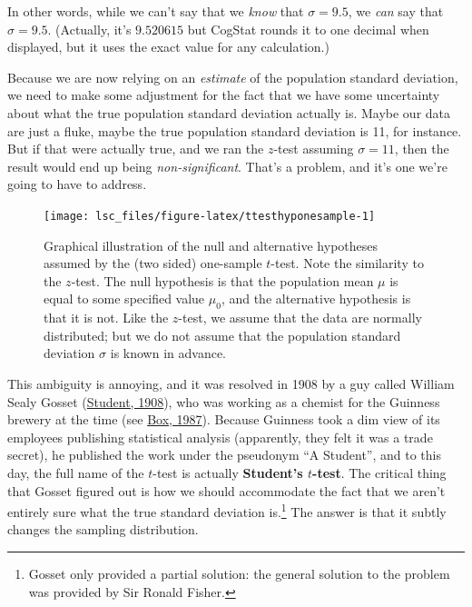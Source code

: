 \documentclass[
]{book}
\theoremstyle{definition}
\theoremstyle{definition}
\theoremstyle{definition}
\theoremstyle{definition}
\theoremstyle{remark}
\begin{document}
In other words, while we can't say that we \emph{know} that \(\sigma = 9.5\), we \emph{can} say that \(\hat\sigma = 9.5\). (Actually, it's \(9.520615\) but CogStat rounds it to one decimal when displayed, but it uses the exact value for any calculation.)

Because we are now relying on an \emph{estimate} of the population standard deviation, we need to make some adjustment for the fact that we have some uncertainty about what the true population standard deviation actually is. Maybe our data are just a fluke, maybe the true population standard deviation is 11, for instance. But if that were actually true, and we ran the \(z\)-test assuming \(\sigma=11\), then the result would end up being \emph{non-significant}. That's a problem, and it's one we're going to have to address.

\begin{figure}

{\centering \texttt{[image: lsc\_files/figure-latex/ttesthyponesample-1]} 

}

\caption{Graphical illustration of the null and alternative hypotheses assumed by the (two sided) one-sample $t$-test. Note the similarity to the $z$-test. The null hypothesis is that the population mean $\mu$ is equal to some specified value $\mu_0$, and the alternative hypothesis is that it is not. Like the $z$-test, we assume that the data are normally distributed; but we do not assume that the population standard deviation $\sigma$ is known in advance.}\label{fig:ttesthyponesample}
\end{figure}

This ambiguity is annoying, and it was resolved in 1908 by a guy called William Sealy Gosset (\protect\hyperlink{ref-Student1908}{Student, 1908}), who was working as a chemist for the Guinness brewery at the time (see \protect\hyperlink{ref-Box1987}{Box, 1987}). Because Guinness took a dim view of its employees publishing statistical analysis (apparently, they felt it was a trade secret), he published the work under the pseudonym ``A Student'', and to this day, the full name of the \(t\)-test is actually \textbf{Student's \(t\)-test}. The critical thing that Gosset figured out is how we should accommodate the fact that we aren't entirely sure what the true standard deviation is.\footnote{Gosset only provided a partial solution: the general solution to the problem was provided by Sir Ronald Fisher.} The answer is that it subtly changes the sampling distribution.
\end{document}
